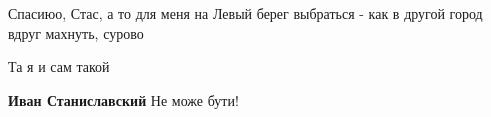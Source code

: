 
 
 
 
 

\qqSecCmt


Спасиюо, Стас, а то для меня на Левый берег выбраться - как в другой город
вдруг махнуть, сурово 🙂

\begin{itemize} %

Та я и сам такой

\textbf{Иван Станиславский} Не може бути! 🙂
\end{itemize} %
